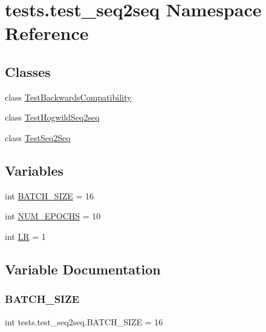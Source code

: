 \hypertarget{namespacetests_1_1test__seq2seq}{}\section{tests.\+test\+\_\+seq2seq Namespace Reference}
\label{namespacetests_1_1test__seq2seq}
\subsection*{Classes}
\begin{DoxyCompactItemize}
\item 
class \hyperlink{classtests_1_1test__seq2seq_1_1TestBackwardsCompatibility}{Test\+Backwards\+Compatibility}
\item 
class \hyperlink{classtests_1_1test__seq2seq_1_1TestHogwildSeq2seq}{Test\+Hogwild\+Seq2seq}
\item 
class \hyperlink{classtests_1_1test__seq2seq_1_1TestSeq2Seq}{Test\+Seq2\+Seq}
\end{DoxyCompactItemize}
\subsection*{Variables}
\begin{DoxyCompactItemize}
\item 
int \hyperlink{namespacetests_1_1test__seq2seq_aee85d0c290120a96250b6139ac2f43e4}{B\+A\+T\+C\+H\+\_\+\+S\+I\+ZE} = 16
\item 
int \hyperlink{namespacetests_1_1test__seq2seq_ab3399ea30b5c0b509ef2c0f38f51ce05}{N\+U\+M\+\_\+\+E\+P\+O\+C\+HS} = 10
\item 
int \hyperlink{namespacetests_1_1test__seq2seq_ab827bc994f6e9df276190043cc2f781b}{LR} = 1
\end{DoxyCompactItemize}


\subsection{Variable Documentation}
\mbox{\label{namespacetests_1_1test__seq2seq_aee85d0c290120a96250b6139ac2f43e4}} 
\subsubsection{\texorpdfstring{B\+A\+T\+C\+H\+\_\+\+S\+I\+ZE}{BATCH\_SIZE}}
{\footnotesize\ttfamily int tests.\+test\+\_\+seq2seq.\+B\+A\+T\+C\+H\+\_\+\+S\+I\+ZE = 16}

